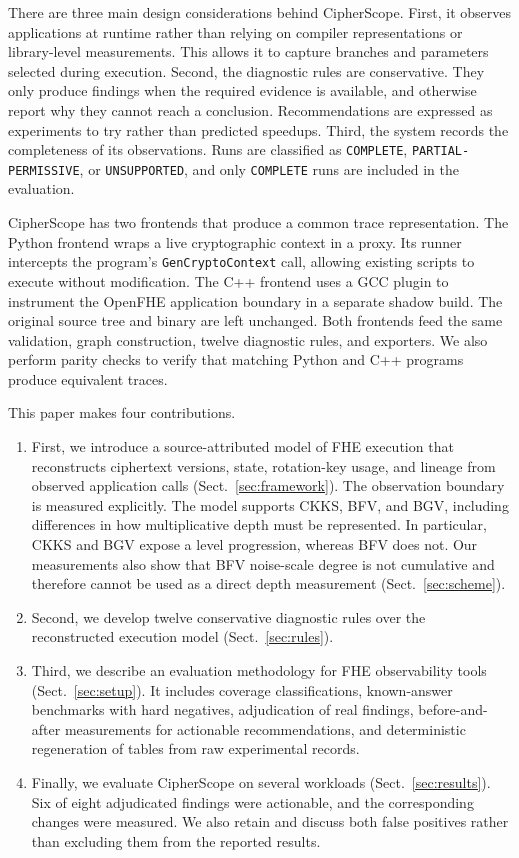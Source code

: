 \documentclass[pdflatex,sn-basic,Numbered,iicol]{sn-jnl}
\begin{document}
There are three main design considerations behind CipherScope. First, it
observes applications at runtime rather than relying on compiler
representations or library-level measurements. This allows it to capture
branches and parameters selected during execution. Second, the diagnostic
rules are conservative. They only produce findings when the required evidence
is available, and otherwise report why they cannot reach a conclusion.
Recommendations are expressed as experiments to try rather than predicted
speedups. Third, the system records the completeness of its observations.
Runs are classified as \texttt{COMPLETE}, \texttt{PARTIAL-PERMISSIVE}, or
\texttt{UNSUPPORTED}, and only \texttt{COMPLETE} runs are included in the
evaluation.

CipherScope has two frontends that produce a common trace representation. The
Python frontend wraps a live cryptographic context in a proxy. Its runner
intercepts the program's \texttt{GenCryptoContext} call, allowing existing
scripts to execute without modification. The C++ frontend uses a GCC plugin
to instrument the OpenFHE application boundary in a separate shadow build.
The original source tree and binary are left unchanged. Both frontends feed
the same validation, graph construction, twelve diagnostic rules, and
exporters. We also perform parity checks to verify that matching Python and
C++ programs produce equivalent traces.

This paper makes four contributions.

\begin{enumerate}
\item First, we introduce a source-attributed model of FHE execution that
  reconstructs ciphertext versions, state, rotation-key usage, and lineage
  from observed application calls (Sect.~\ref{sec:framework}). The observation
  boundary is measured explicitly. The model supports CKKS, BFV, and BGV,
  including differences in how multiplicative depth must be represented. In
  particular, CKKS and BGV expose a level progression, whereas BFV does not.
  Our measurements also show that BFV noise-scale degree is not cumulative
  and therefore cannot be used as a direct depth measurement
  (Sect.~\ref{sec:scheme}).
\item Second, we develop twelve conservative diagnostic rules over the
  reconstructed execution model (Sect.~\ref{sec:rules}).
\item Third, we describe an evaluation methodology for FHE observability
  tools (Sect.~\ref{sec:setup}). It includes coverage classifications,
  known-answer benchmarks with hard negatives, adjudication of real findings,
  before-and-after measurements for actionable recommendations, and
  deterministic regeneration of tables from raw experimental records.
\item Finally, we evaluate CipherScope on several workloads
  (Sect.~\ref{sec:results}). Six of eight adjudicated findings were actionable,
  and the corresponding changes were measured. We also retain and discuss
  both false positives rather than excluding them from the reported results.
\end{enumerate}
\end{document}
